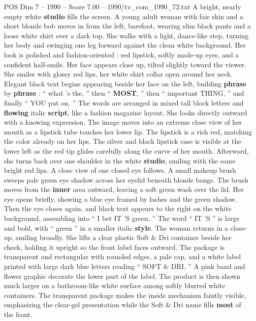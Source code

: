 \begin{textsample}{POS Dim 7 – 1990 – Score 7.00 – 1990/tv\_com\_1990\_72.txt}  \label{ex:f7_pos_063}
A bright, nearly empty white \textbf{studio} fills the screen.
A young adult woman with fair skin and a short blonde bob moves in from the left, barefoot, wearing slim black pants and a loose white shirt over a dark top.
She walks with a light, dance-like step, turning her body and swinging one leg forward against the clean white background.
Her look is polished and fashion-oriented : red lipstick, softly made-up eyes, and a confident half-smile.
Her face appears close up, tilted slightly toward the viewer.
She smiles with glossy red lips, her white shirt collar open around her neck.
Elegant black text begins appearing beside her face on the left, building \textbf{phrase} by \textbf{phrase} : “ what ’s the, ” then “ \textbf{MOST}, ” then “ important THING, ” and finally “ YOU put on. ” The words are arranged in mixed tall block letters and \textbf{flowing} italic \textbf{script}, like a fashion magazine layout.
She looks directly outward with a knowing expression.
The image moves into an extreme close view of her mouth as a lipstick tube touches her lower lip.
The lipstick is a rich red, matching the color already on her lips.
The silver and black lipstick case is visible at the lower left as the red tip glides carefully along the curve of her mouth.
Afterward, she turns back over one shoulder in the white \textbf{studio}, smiling with the same bright red lips.
A close view of one closed eye follows.
A small makeup brush sweeps pale green eye shadow across her eyelid beneath blonde bangs.
The brush moves from the \textbf{inner} area outward, leaving a soft green wash over the lid.
Her eye opens briefly, showing a blue eye framed by lashes and the green shadow.
Then the eye closes again, and black text appears to the right on the white background, assembling into “ I bet IT ’S green. ” The word “ IT ’S ” is large and bold, with “ green ” in a smaller italic \textbf{style}.
The woman returns in a close-up, smiling broadly.
She lifts a clear plastic Soft \& Dri container beside her cheek, holding it upright so the front label faces outward.
The package is transparent and rectangular with rounded edges, a pale cap, and a white label printed with large dark blue letters reading “ SOFT \& DRI. ” A pink band and flower graphic decorate the lower part of the label.
The product is then shown much larger on a bathroom-like white surface among softly blurred white containers.
The transparent package makes the inside mechanism faintly visible, emphasizing the clear-gel presentation while the Soft \& Dri name fills \textbf{most} of the front.

\end{textsample}
